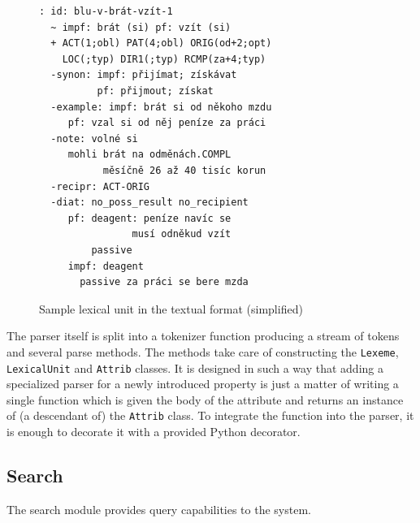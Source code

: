 \documentclass[10pt, a4paper]{article}
\newcommand{\py}[1]{{\tt #1}}
\begin{document}
\begin{figure}
\small
\begin{verbatim}
: id: blu-v-brát-vzít-1
  ~ impf: brát (si) pf: vzít (si)
  + ACT(1;obl) PAT(4;obl) ORIG(od+2;opt)
    LOC(;typ) DIR1(;typ) RCMP(za+4;typ)
  -synon: impf: přijímat; získávat
          pf: přijmout; získat
  -example: impf: brát si od někoho mzdu
     pf: vzal si od něj peníze za práci
  -note: volné si
     mohli brát na odměnách.COMPL
           měsíčně 26 až 40 tisíc korun
  -recipr: ACT-ORIG
  -diat: no_poss_result no_recipient
     pf: deagent: peníze navíc se
                musí odněkud vzít
         passive
     impf: deagent
       passive za práci se bere mzda
\end{verbatim}
\caption{\label{fig:txt-fmt}Sample lexical unit in the textual format (simplified)}
\end{figure}

The parser itself is split into a tokenizer function producing a stream of tokens and several
parse methods. The methods take care of constructing the \py{Lexeme}, \py{LexicalUnit}
and \py{Attrib} classes. It is designed in such a way that adding a specialized parser for
a newly introduced property is just a matter of writing a single function which is given
the body of the attribute and returns an instance of (a descendant of) the \py{Attrib} class.
To integrate the function into the parser, it is enough to decorate it with a provided
Python decorator.

\subsection{Search}
The search module provides query capabilities to the system.
\end{document}
